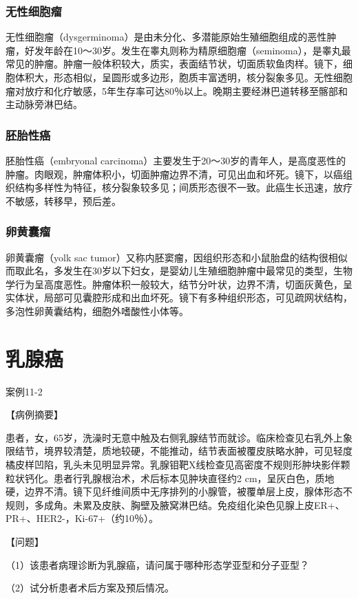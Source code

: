 \subsubsection{无性细胞瘤}

无性细胞瘤（dysgerminoma）是由未分化、多潜能原始生殖细胞组成的恶性肿瘤，好发年龄在10～30岁。发生在睾丸则称为精原细胞瘤（seminoma），是睾丸最常见的肿瘤。肿瘤一般体积较大，质实，表面结节状，切面质软鱼肉样。镜下，细胞体积大，形态相似，呈圆形或多边形，胞质丰富透明，核分裂象多见。无性细胞瘤对放疗和化疗敏感，5年生存率可达80％以上。晚期主要经淋巴道转移至髂部和主动脉旁淋巴结。

\subsubsection{胚胎性癌}

胚胎性癌（embryonal
carcinoma）主要发生于20～30岁的青年人，是高度恶性的肿瘤。肉眼观，肿瘤体积小，切面肿瘤边界不清，可见出血和坏死。镜下，以癌组织结构多样性为特征，核分裂象较多见；间质形态很不一致。此癌生长迅速，放疗不敏感，转移早，预后差。

\subsubsection{卵黄囊瘤}

卵黄囊瘤（yolk sac
tumor）又称内胚窦瘤，因组织形态和小鼠胎盘的结构很相似而取此名，多发生在30岁以下妇女，是婴幼儿生殖细胞肿瘤中最常见的类型，生物学行为呈高度恶性。肿瘤体积一般较大，结节分叶状，边界不清，切面灰黄色，呈实体状，局部可见囊腔形成和出血坏死。镜下有多种组织形态，可见疏网状结构，多泡性卵黄囊结构，细胞外嗜酸性小体等。

\section{乳腺癌}

\begin{framed}
{案例11-2}

{【病例摘要】}

患者，女，65岁，洗澡时无意中触及右侧乳腺结节而就诊。临床检查见右乳外上象限结节，境界较清楚，质地较硬，不能推动，结节表面被覆皮肤略水肿，可见轻度橘皮样凹陷，乳头未见明显异常。乳腺钼靶X线检查见高密度不规则形肿块影伴颗粒状钙化。患者行乳腺根治术，术后标本见肿块直径约2
cm，呈灰白色，质地硬，边界不清。镜下见纤维间质中无序排列的小腺管，被覆单层上皮，腺体形态不规则，多成角。未累及皮肤、胸壁及腋窝淋巴结。免疫组化染色见腺上皮ER+、PR+、HER2-，Ki-67+（约10％）。

{【问题】}

（1）该患者病理诊断为乳腺癌，请问属于哪种形态学亚型和分子亚型？

（2）试分析患者术后方案及预后情况。
\end{framed}


